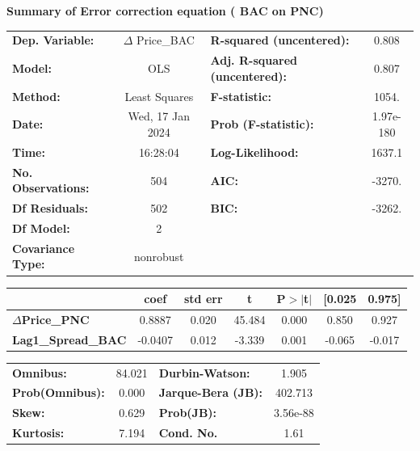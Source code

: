 \documentclass[a4paper, 11pt]{article}
\begin{document}
\begin{enumerate}[A.]
\textbf{Summary of Error correction equation ( BAC on PNC)} 
\begin{center}
\begin{tabular}{lclc}
\toprule
\textbf{Dep. Variable:}    &   $\Delta$ Price\_BAC    & \textbf{  R-squared (uncentered):}      &     0.808   \\
\textbf{Model:}            &       OLS        & \textbf{  Adj. R-squared (uncentered):} &     0.807   \\
\textbf{Method:}           &  Least Squares   & \textbf{  F-statistic:       }          &     1054.   \\
\textbf{Date:}             & Wed, 17 Jan 2024 & \textbf{  Prob (F-statistic):}          & 1.97e-180   \\
\textbf{Time:}             &     16:28:04     & \textbf{  Log-Likelihood:    }          &    1637.1   \\
\textbf{No. Observations:} &         504      & \textbf{  AIC:               }          &    -3270.   \\
\textbf{Df Residuals:}     &         502      & \textbf{  BIC:               }          &    -3262.   \\
\textbf{Df Model:}         &           2      & \textbf{                     }          &             \\
\textbf{Covariance Type:}  &    nonrobust     & \textbf{                     }          &             \\
\bottomrule
\end{tabular}
\begin{tabular}{lcccccc}
                           & \textbf{coef} & \textbf{std err} & \textbf{t} & \textbf{P$> |$t$|$} & \textbf{[0.025} & \textbf{0.975]}  \\
\midrule
\textbf{$\Delta$Price\_PNC}       &       0.8887  &        0.020     &    45.484  &         0.000        &        0.850    &        0.927     \\
\textbf{Lag1\_Spread\_BAC} &      -0.0407  &        0.012     &    -3.339  &         0.001        &       -0.065    &       -0.017     \\
\bottomrule
\end{tabular}
\begin{tabular}{lclc}
\textbf{Omnibus:}       & 84.021 & \textbf{  Durbin-Watson:     } &    1.905  \\
\textbf{Prob(Omnibus):} &  0.000 & \textbf{  Jarque-Bera (JB):  } &  402.713  \\
\textbf{Skew:}          &  0.629 & \textbf{  Prob(JB):          } & 3.56e-88  \\
\textbf{Kurtosis:}      &  7.194 & \textbf{  Cond. No.          } &     1.61  \\
\bottomrule
\end{tabular}
\end{center}


\end{enumerate}
\end{document}
